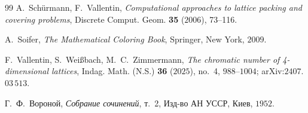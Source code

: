 \documentclass[11pt]{article}
\theoremstyle{definition}
\theoremstyle{remark}
\begin{document}
\begin{thebibliography}{99}
 A.~Sch\"urmann, F.~Vallentin,
\emph{Computational approaches to lattice packing and covering problems},
Discrete Comput. Geom. \textbf{35} ($2006$), 73--116.

 A.~Soifer,
\emph{The Mathematical Coloring Book}, Springer, New York, $2009$.

 F.~Vallentin, S.~Wei\ss bach, M.~C.~Zimmermann,
\emph{The chromatic number of 4-dimensional lattices},
Indag. Math. (N.S.) \textbf{36} ($2025$), no.~4, $988$--$1004$; arXiv:$2407$.$03\,513$.

 Г.~Ф.~Вороной,
\emph{Собрание сочинений}, т.~2, Изд-во АН УССР, Киев, $1952$.

\end{thebibliography}
\end{document}
